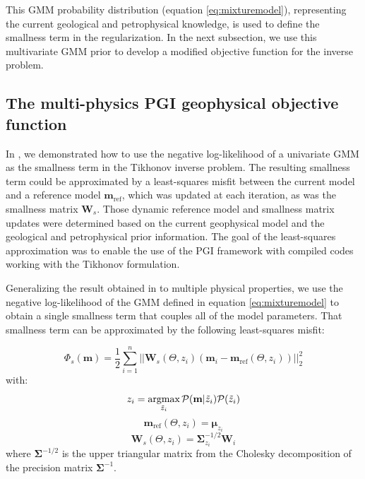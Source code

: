 \documentclass[extra, mreferee]{gji_joint} %
\begin{document}
This GMM probability distribution (equation \eqref{eq:mixturemodel}), representing the current geological and petrophysical knowledge, is used to define the smallness term in the regularization. In the next subsection, we use this multivariate GMM prior to develop a modified objective function for the inverse problem.

\subsection{The multi-physics PGI geophysical objective function}

In \citet{ggz389}, we demonstrated how to use the negative log-likelihood of a univariate GMM as the smallness term in the Tikhonov inverse problem. The resulting smallness term could be approximated by a least-squares misfit between the current model and a reference model $\mathbf{m}_{\text{ref}}$, which was updated at each iteration, as was the smallness matrix $\mathbf{W}_s$. Those dynamic reference model and smallness matrix updates were determined based on the current geophysical model and the geological and petrophysical prior information. The goal of the least-squares approximation was to enable the use of the PGI framework with compiled codes working with the Tikhonov formulation.

Generalizing the result obtained in \citet{ggz389} to multiple physical properties, we use the negative log-likelihood of the GMM defined in equation \eqref{eq:mixturemodel} to obtain a single smallness term that couples all of the model parameters. That smallness term can be approximated by the following least-squares misfit:

\begin{equation}
\Phi_s(\mathbf{m}) = \frac{1}{2}\sum_{i=1}^n||\mathbf{W}_{s}(\Theta, z_i)(\mathbf{m}_i-\mathbf{m}_{\text{ref}}(\Theta, z_i))||_2^2 \label{eq:smallness_petro}
\end{equation}
with:
\begin{equation}
z_i = \mathop{\hbox{argmax}}\limits_{\tilde{z}_i}\mathcal{P}(\mathbf{m}|\tilde{z}_i)\mathcal{P}(\tilde{z}_i) \label{eq:membership}
\end{equation}
\begin{equation}
\mathbf{m}_{\text{ref}}(\Theta, z_i) = \mathbf{\mu}_{z_i} \label{eq:mref_update}
\end{equation}
\begin{equation}
\mathbf{W}_{s}(\Theta, z_i) = \mathbf{\Sigma}_{z_i}^{-1/2} \mathbf{W}_i\label{eq:Ws_update}
\end{equation}
where $\mathbf{\Sigma}^{-1/2}$ is the upper triangular matrix from the Cholesky decomposition of the precision matrix $\mathbf{\Sigma}^{-1}$.
\end{document}
